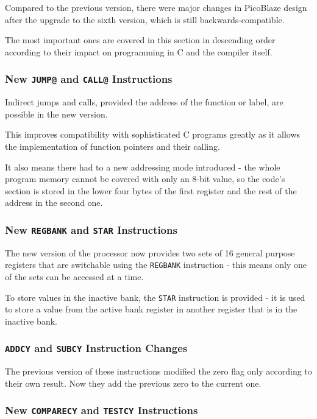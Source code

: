     Compared to the previous version, there were major changes in PicoBlaze design after the upgrade to the sixth version, which is still backwards-compatible.

    The most important ones are covered in this section in descending order according to their impact on programming in C and the compiler itself.\cite{PicoBlaze6}

        \subsubsection{New \texttt{JUMP@} and \texttt{CALL@} Instructions}\label{jumpat}

        Indirect jumps and calls, provided the address of the function or label, are possible in the new version.

        This improves compatibility with sophisticated C programs greatly as it allows the implementation of function pointers and their calling.

        It also means there had to a new addressing mode introduced - the whole program memory cannot be covered with only an 8-bit value, so the code's section is stored in the lower four bytes of the first register and the rest of the address in the second one.

        \subsubsection{New \texttt{REGBANK} and \texttt{STAR} Instructions}

        The new version of the processor now provides two sets of 16 general purpose registers that are switchable using the \texttt{REGBANK} instruction - this means only one of the sets can be accessed at a time.

        To store values in the inactive bank, the \texttt{STAR} instruction is provided - it is used to store a value from the active bank register in another register that is in the inactive bank.

        \subsubsection{\texttt{ADDCY} and \texttt{SUBCY} Instruction Changes}

        The previous version of these instructions modified the zero flag only according to their own result. Now they add the previous zero to the current one.

        \subsubsection{New \texttt{COMPARECY} and \texttt{TESTCY} Instructions}


